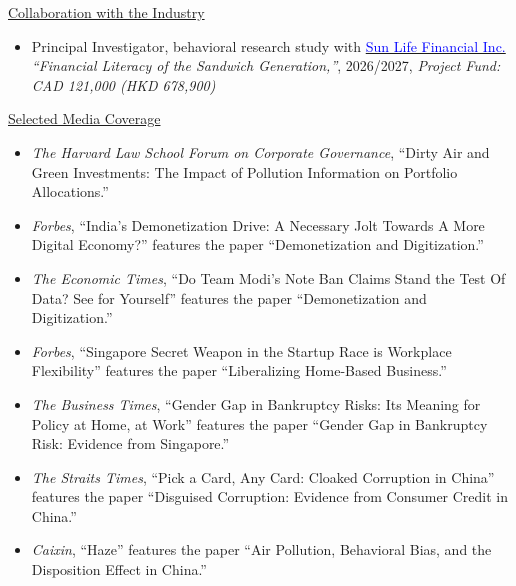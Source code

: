 \documentclass[11pt]{article}
\newcommand{\publink}[2]{\href{#1}{\textcolor{blue}{#2}}}
\begin{document}
\underline{Collaboration with the Industry}
\begin{itemize}
\item Principal Investigator, behavioral research study with \textcolor{blue!70!black}{\publink{https://www.sunlife.ca/en/}{Sun Life Financial Inc.} \emph{``Financial Literacy of the Sandwich Generation,''}}, 2026/2027, \textit{Project Fund: CAD 121,000 (HKD 678,900)}
\end{itemize}

\underline{Selected Media Coverage}
\begin{itemize}
\item \textcolor{blue!70!black}{\emph{The Harvard Law School Forum on Corporate Governance}}, ``Dirty Air and Green Investments: The Impact of Pollution Information on Portfolio Allocations.''
\item \textcolor{blue!70!black}{\emph{Forbes}}, ``India's Demonetization Drive: A Necessary Jolt Towards A More Digital Economy?'' features the paper ``Demonetization and Digitization.''
\item \textcolor{blue!70!black}{\emph{The Economic Times}}, ``Do Team Modi's Note Ban Claims Stand the Test Of Data? See for Yourself'' features the paper ``Demonetization and Digitization.''
\item \textcolor{blue!70!black}{\emph{Forbes}}, ``Singapore Secret Weapon in the Startup Race is Workplace Flexibility'' features the paper ``Liberalizing Home-Based Business.''
\item \textcolor{blue!70!black}{\emph{The Business Times}}, ``Gender Gap in Bankruptcy Risks: Its Meaning for Policy at Home, at Work'' features the paper ``Gender Gap in Bankruptcy Risk: Evidence from Singapore.''
\item \textcolor{blue!70!black}{\emph{The Straits Times}}, ``Pick a Card, Any Card: Cloaked Corruption in China'' features the paper ``Disguised Corruption: Evidence from Consumer Credit in China.''
\item \textcolor{blue!70!black}{\emph{Caixin}}, ``Haze'' features the paper ``Air Pollution, Behavioral Bias, and the Disposition Effect in China.''
\end{itemize}
\end{document}

